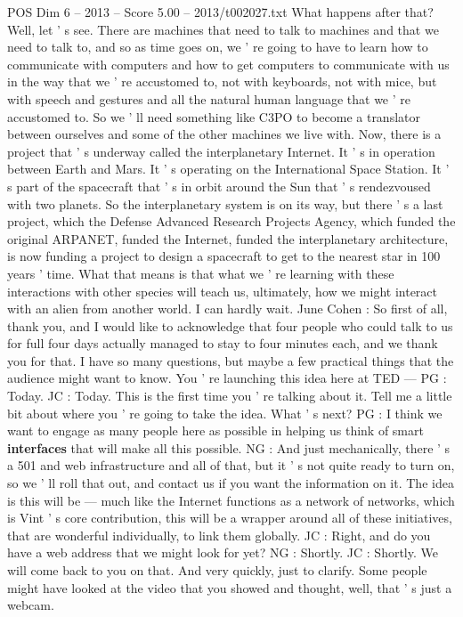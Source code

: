 \begin{textsample}{POS Dim 6 – 2013 – Score 5.00 – 2013/t002027.txt}
What happens after that?
Well, let ' s see.
There are machines that need to talk to machines and that we need to talk to, and so as time goes on, we ' re going to have to learn how to communicate with computers and how to get computers to communicate with us in the way that we ' re accustomed to, not with keyboards, not with mice, but with speech and gestures and all the natural human language that we ' re accustomed to.
So we ' ll need something like C3PO to become a translator between ourselves and some of the other machines we live with.
Now, there is a project that ' s underway called the interplanetary Internet.
It ' s in operation between Earth and Mars.
It ' s operating on the International Space Station.
It ' s part of the spacecraft that ' s in orbit around the Sun that ' s rendezvoused with two planets.
So the interplanetary system is on its way, but there ' s a last project, which the Defense Advanced Research Projects Agency, which funded the original ARPANET, funded the Internet, funded the interplanetary architecture, is now funding a project to design a spacecraft to get to the nearest star in 100 years ' time.
What that means is that what we ' re learning with these interactions with other species will teach us, ultimately, how we might interact with an alien from another world.
I can hardly wait.
June Cohen : So first of all, thank you, and I would like to acknowledge that four people who could talk to us for full four days actually managed to stay to four minutes each, and we thank you for that.
I have so many questions, but maybe a few practical things that the audience might want to know.
You ' re launching this idea here at TED — PG : Today.
JC : Today.
This is the first time you ' re talking about it.
Tell me a little bit about where you ' re going to take the idea.
What ' s next?
PG : I think we want to engage as many people here as possible in helping us think of smart \textbf{interfaces} that will make all this possible.
NG : And just mechanically, there ' s a 501 and web infrastructure and all of that, but it ' s not quite ready to turn on, so we ' ll roll that out, and contact us if you want the information on it.
The idea is this will be — much like the Internet functions as a network of networks, which is Vint ' s core contribution, this will be a wrapper around all of these initiatives, that are wonderful individually, to link them globally.
JC : Right, and do you have a web address that we might look for yet?
NG : Shortly.
JC : Shortly.
We will come back to you on that.
And very quickly, just to clarify.
Some people might have looked at the video that you showed and thought, well, that ' s just a webcam.

\end{textsample}
